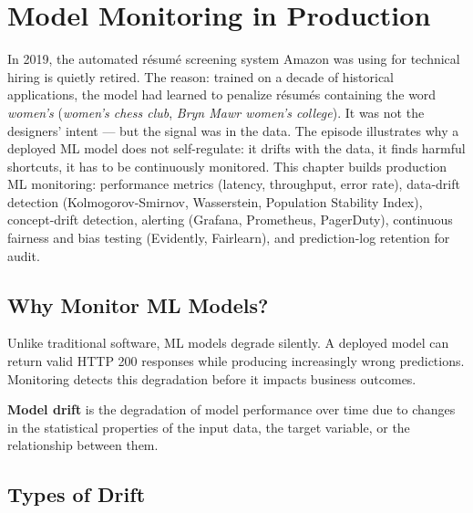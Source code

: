 \chapter{Model Monitoring in Production}
\label{ch:monitoring}

In 2019, the automated résumé screening system Amazon was using for technical hiring is quietly retired. The reason: trained on a decade of historical applications, the model had learned to penalize résumés containing the word \emph{women's} (\emph{women's chess club}, \emph{Bryn Mawr women's college}). It was not the designers' intent --- but the signal was in the data. The episode illustrates why a deployed ML model does not self-regulate: it drifts with the data, it finds harmful shortcuts, it has to be continuously monitored. This chapter builds production ML monitoring: performance metrics (latency, throughput, error rate), data-drift detection (Kolmogorov-Smirnov, Wasserstein, Population Stability Index), concept-drift detection, alerting (Grafana, Prometheus, PagerDuty), continuous fairness and bias testing (Evidently, Fairlearn), and prediction-log retention for audit.

\section{Why Monitor ML Models?}
\label{sec:why-monitoring}

Unlike traditional software, ML models degrade silently. A deployed
model can return valid HTTP 200 responses while producing increasingly
wrong predictions. Monitoring detects this degradation before it
impacts business outcomes.

\begin{definition}
\textbf{Model drift} is the degradation of model
performance over time due to changes in the statistical properties of
the input data, the target variable, or the relationship between them.
\end{definition}

\section{Types of Drift}
\label{sec:drift-types}

